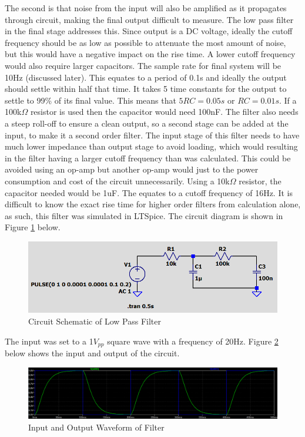\documentclass[class=report,11pt,crop=false]{standalone}
\begin{document}
	The second is that noise from the input will also be amplified as it propagates through circuit, making the final output difficult to measure. The low pass filter in the final stage addresses this. Since output is a DC voltage, ideally the cutoff frequency should be as low as possible to attenuate the most amount of noise, but this would have a negative impact on the rise time. A lower cutoff frequency would also require larger capacitors. The sample rate for final system will be 10Hz (discussed later). This equates to a period of 0.1s and ideally the output should settle within half that time. It takes 5 time constants for the output to settle to 99\% of its final value. This means that $5RC = 0.05s$ or $RC = 0.01s$. If a 100k$\Omega$ resistor is used then the capacitor would need 100nF. The filter also needs a steep roll-off to ensure a clean output, so a second stage can be added at the input, to make it a second order filter. The input stage of this filter needs to have much lower impedance than output stage to avoid loading, which would resulting in the filter having a larger cutoff frequency than was calculated. This could be avoided using an op-amp but another op-amp would just to the power consumption and cost of the circuit unnecessarily. Using a 10k$\Omega$ resistor, the capacitor needed would be 1uF. The equates to a cutoff frequency of 16Hz. It is difficult to know the exact rise time for higher order filters from calculation alone, as such, this filter was simulated in LTSpice. The circuit diagram is shown in Figure \ref{fig:S2} below.
	
	\begin{figure}[h!]
		\centering
		\includegraphics[width=0.5\linewidth]{Figures/Filter.png}
		\caption{Circuit Schematic of Low Pass Filter}
		\label{fig:S2}
	\end{figure}
	
	The input was set to a 1$V_{pp}$ square wave with a frequency of 20Hz. Figure \ref{fig:S3} below shows the input and output of the circuit.
	
	\begin{figure}[h!]
		\centering
		\includegraphics[width=0.9\linewidth]{Figures/Filter Waveform.png}
		\caption{Input and Output Waveform of Filter}
		\label{fig:S3}
	\end{figure}
	
\end{document}
